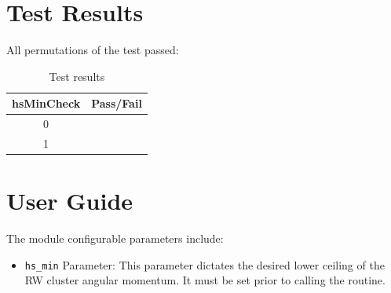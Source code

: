 \documentclass[]{BasiliskReportMemo}
\begin{document}
\section{Test Results}
All permutations of the test passed:
\begin{table}[h]
	\caption{Test results}
	\label{tab:results}
	\centering \fontsize{10}{10}\selectfont
	\begin{tabular}{c | c  } %
		\hline\hline
		\textbf{hsMinCheck} 	&\textbf{Pass/Fail} \\ 
		\hline
	   0	   			&  \\ 
	   1 	   			&  \\ 
	   \hline\hline
	\end{tabular}
\end{table}












\section{User Guide}
The module configurable parameters include:
\begin{itemize}
	\item {{\tt hs\_min} Parameter}:
This parameter dictates the desired lower ceiling of the RW cluster angular momentum.  It must be set prior to calling the routine.  
\end{itemize}
\end{document}
